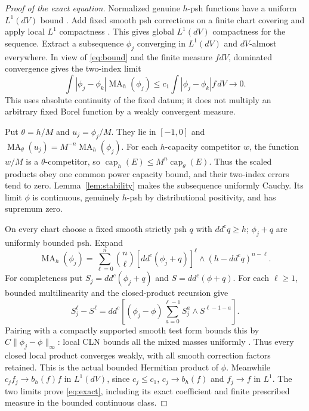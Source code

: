 \documentclass[11pt]{article}
\newcommand{\ddc}{dd^c}
\newcommand{\MA}{\operatorname{MA}}
\newcommand{\capH}{\operatorname{cap}}
\theoremstyle{remark}\newtheorem{remark}[theorem]{Remark}
\begin{document}
\begin{proof}[Proof of the exact equation]
Normalized genuine $h$-psh functions have a uniform $L^1(dV)$ bound
\cite[Proposition 2.1]{DK}. Add fixed smooth psh corrections on a finite
chart covering and apply local $L^1$ compactness
\cite[Chapter I, Propositions 4.21 and 5.9]{Dem}. This gives global
$L^1(dV)$ compactness for the sequence.
Extract a subsequence $\phi_j$ converging in $L^1(dV)$ and $dV$-almost
everywhere. In view of \eqref{eq:bound} and the finite measure $fdV$,
dominated convergence gives the two-index limit
\[
 \int|\phi_j-\phi_k|\MA_h(\phi_j)
   \leq c_1\int|\phi_j-\phi_k|f\,dV\longrightarrow0.
\]
This uses absolute continuity of the fixed datum; it does not multiply
an arbitrary fixed Borel function by a weakly convergent measure.

Put $\theta=h/M$ and $u_j=\phi_j/M$. They lie in $[-1,0]$ and
$\MA_\theta(u_j)=M^{-n}\MA_h(\phi_j)$.
For each $h$-capacity competitor $w$, the function $w/M$ is a
$\theta$-competitor, so
$\capH_h(E)\leq M^n\capH_\theta(E)$.
Thus the scaled products obey one common power capacity bound,
and their two-index errors tend to zero. Lemma~\ref{lem:stability}
makes the subsequence uniformly Cauchy. Its limit $\phi$ is continuous,
genuinely $h$-psh by distributional positivity, and has supremum zero.

On every chart choose a fixed smooth strictly psh $q$ with
$\ddc q\geq h$; $\phi_j+q$ are uniformly bounded psh. Expand
\[
 \MA_h(\phi_j)
 =\sum_{\ell=0}^n\binom n\ell
      [\ddc(\phi_j+q)]^\ell\wedge(h-\ddc q)^{n-\ell}.
\]
For completeness put $S_j=\ddc(\phi_j+q)$ and $S=\ddc(\phi+q)$.
For each $\ell\geq1$, bounded multilinearity and the closed-product
recursion \cite[Section 2]{BT} give
\[
 S_j^\ell-S^\ell=\ddc\left[(\phi_j-\phi)
          \sum_{a=0}^{\ell-1}S_j^a\wedge S^{\ell-1-a}\right].
\]
Pairing with a compactly supported smooth test form bounds this by
$C\|\phi_j-\phi\|_\infty$: local CLN bounds all the mixed masses
uniformly \cite[Theorem 2.10]{BT}. Thus every closed local product
converges weakly, with all smooth correction factors retained.
This is the actual bounded Hermitian product of $\phi$.
Meanwhile $c_jf_j\to b_h(f)f$ in $L^1(dV)$, since $c_j\leq c_1$,
$c_j\to b_h(f)$ and $f_j\to f$ in $L^1$.
The two limits prove \eqref{eq:exact}, including its exact coefficient
and finite prescribed measure in the bounded continuous class.
\end{proof}
\end{document}
